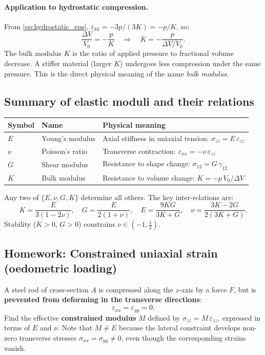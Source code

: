 \paragraph{Application to hydrostatic compression.}
From \eqref{eq:hydrostatic_eps}, $\varepsilon_{kk} = -3p/(3K) = -p/K$, so:
\[
    \frac{\Delta V}{V_0} = -\frac{p}{K} \quad \Longrightarrow \quad K = -\frac{p}{\Delta V/V_0}.
\]
The bulk modulus $K$ is the ratio of applied pressure to fractional volume decrease. A stiffer material (larger $K$) undergoes less compression under the same pressure. This is the direct physical meaning of the name \textit{bulk modulus}.

\subsection*{Summary of elastic moduli and their relations}

\begin{center}
\begin{tabular}{llp{7cm}}
\toprule
Symbol & Name & Physical meaning \\
\midrule
$E$ & Young's modulus & Axial stiffness in uniaxial tension: $\sigma_{zz} = E\,\varepsilon_{zz}$ \\
$\nu$ & Poisson's ratio & Transverse contraction: $\varepsilon_{xx} = -\nu\,\varepsilon_{zz}$ \\
$G$ & Shear modulus & Resistance to shape change: $\sigma_{12}=G\,\gamma_{12}$ \\
$K$ & Bulk modulus & Resistance to volume change: $K=-p\,V_0/\Delta V$ \\
\bottomrule
\end{tabular}
\end{center}

Any two of $\{E,\nu,G,K\}$ determine all others. The key inter-relations are:
\begin{equation}
    K = \frac{E}{3(1-2\nu)}, \quad
    G = \frac{E}{2(1+\nu)}, \quad
    E = \frac{9KG}{3K+G}, \quad
    \nu = \frac{3K-2G}{2(3K+G)}.
    \label{eq:moduli_relations}
\end{equation}
Stability ($K>0$, $G>0$) constrains $\nu\in(-1,\tfrac{1}{2})$.

\subsection*{Homework: Constrained uniaxial strain (oedometric loading)}

A steel rod of cross-section $A$ is compressed along the $z$-axis by a force $F$, but is \textbf{prevented from deforming in the transverse directions}:
\[
    \varepsilon_{xx} = \varepsilon_{yy} = 0.
\]
Find the effective \textbf{constrained modulus} $M$ defined by $\sigma_{zz} = M\,\varepsilon_{zz}$, expressed in terms of $E$ and $\nu$. Note that $M \neq E$ because the lateral constraint develops non-zero transverse stresses $\sigma_{xx}=\sigma_{yy}\neq 0$, even though the corresponding strains vanish.
